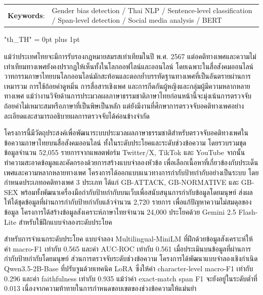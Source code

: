 \documentclass[12pt,oneside,openright,a4paper]{cpe-english-project}
\begin{document}
\begin{flushleft}
\begin{tabular*}{\textwidth}{@{}lp{}}
\textbf{Keywords}: & Gender bias detection / Thai NLP / Sentence-level classification / Span-level detection / Social media analysis / BERT
\end{tabular*}
\end{flushleft}
\endabstract

{
\XeTeXlinebreaklocale "th_TH"
\XeTeXlinebreakskip = 0pt plus 1pt
\thaifont
\thaiabstract

แม้ว่าประเทศไทยจะมีการรับรองกฎหมายสมรสเท่าเทียมในปี พ.ศ. 2567 แต่อคติทางเพศและความไม่เท่าเทียมทางเพศยังคงปรากฏให้เห็นทั้งในโลกออฟไลน์และออนไลน์ โดยเฉพาะในสื่อสังคมออนไลน์ วาทกรรมภาษาไทยบนโลกออนไลน์มักสะท้อนและตอกย้ำบรรทัดฐานทางเพศที่เป็นอันตรายผ่านการเหมารวม การใช้ถ้อยคำดูหมิ่น การสื่อสารเชิงเพศ และการกีดกันผู้หญิงและกลุ่มผู้มีความหลากหลายทางเพศ แม้ว่างานวิจัยด้านการประมวลผลภาษาธรรมชาติภาษาไทยก่อนหน้านี้จะมุ่งเน้นการตรวจจับถ้อยคำไม่เหมาะสมหรือภาษาที่เป็นพิษเป็นหลัก แต่ยังมีงานที่ศึกษาการตรวจจับอคติทางเพศอย่างละเอียดและสามารถอธิบายผลการตรวจจับได้ค่อนข้างจำกัด

โครงการนี้มีวัตถุประสงค์เพื่อพัฒนาระบบประมวลผลภาษาธรรมชาติสำหรับตรวจจับอคติทางเพศในข้อความภาษาไทยบนสื่อสังคมออนไลน์ ทั้งในระดับประโยคและระดับช่วงข้อความ โดยรวบรวมชุดข้อมูลจำนวน 52,055 รายการจากแพลตฟอร์ม Twitter/X, TikTok และ YouTube จากนั้นทำความสะอาดข้อมูลและคัดกรองด้วยการสร้างแบบจำลองหัวข้อ เพื่อเลือกเนื้อหาที่เกี่ยวข้องกับประเด็นเพศและความหลากหลายทางเพศ โครงการได้ออกแบบแนวทางการกำกับป้ายกำกับอย่างเป็นระบบ โดยกำหนดประเภทอคติทางเพศ 3 ประเภท ได้แก่ GB-ATTACK, GB-NORMATIVE และ GB-SEX พร้อมทั้งพัฒนาเครื่องมือกำกับป้ายกำกับบนเว็บเพื่อสนับสนุนการกำกับข้อมูลโดยมนุษย์ ส่งผลให้ได้ชุดข้อมูลที่ผ่านการกำกับป้ายกำกับแล้วจำนวน 2,720 รายการ เพื่อแก้ปัญหาความไม่สมดุลของข้อมูล โครงการได้สร้างข้อมูลสังเคราะห์ภาษาไทยจำนวน 24,000 ประโยคด้วย Gemini 2.5 Flash-Lite สำหรับใช้ฝึกแบบจำลองระดับประโยค

สำหรับการจำแนกระดับประโยค แบบจำลอง Multilingual-MiniLM ที่ฝึกด้วยข้อมูลสังเคราะห์ให้ค่า macro-F1 เท่ากับ 0.565 และค่า AUC-ROC เท่ากับ 0.561 เมื่อประเมินบนข้อมูลที่ผ่านการกำกับป้ายกำกับโดยมนุษย์ ส่วนการตรวจจับระดับช่วงข้อความ โครงการได้พัฒนาแบบจำลองเชิงกำเนิด Qwen3.5-2B-Base ที่ปรับจูนด้วยเทคนิค LoRA ซึ่งให้ค่า character-level macro-F1 เท่ากับ 0.296 และค่า faithfulness เท่ากับ 0.935 แม้ว่าค่า exact-match span F1 จะยังอยู่ในระดับต่ำที่ 0.013 เนื่องจากความท้าทายในการกำหนดขอบเขตของช่วงข้อความให้แม่นยำ

}
\end{document}
